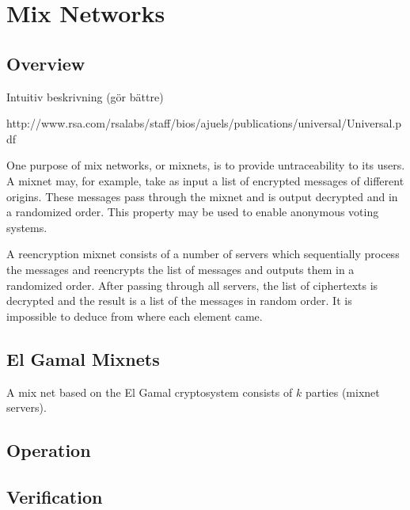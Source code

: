 \section{Mix Networks}



\subsection{Overview}

Intuitiv beskrivning (gör bättre)

http://www.rsa.com/rsalabs/staff/bios/ajuels/publications/universal/Universal.pdf

One purpose of mix networks, or mixnets, is to provide untraceability
to its users. A mixnet may, for example, take as input a list of
encrypted messages of different origins. These messages pass through
the mixnet and is output decrypted and in a randomized order. This
property may be used to enable anonymous voting systems.

A reencryption mixnet consists of a number of servers which
sequentially process the messages and reencrypts the list of messages
and outputs them in a randomized order. After passing through all
servers, the list of ciphertexts is decrypted and the result is a list
of the messages in random order. It is impossible to deduce from where
each element came.

\subsection{El Gamal Mixnets}

A mix net based on the El Gamal cryptosystem consists of $k$ parties
(mixnet servers).


\subsection{Operation}

\subsection{Verification}

